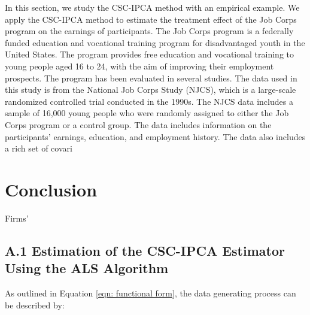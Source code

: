 \documentclass[12pt]{article}
\begin{document}
In this section, we study the CSC-IPCA method with an empirical example. We apply the CSC-IPCA method to estimate the treatment effect of the Job Corps program on the earnings of participants. The Job Corps program is a federally funded education and vocational training program for disadvantaged youth in the United States. The program provides free education and vocational training to young people aged 16 to 24, with the aim of improving their employment prospects. The program has been evaluated in several studies. The data used in this study is from the National Job Corps Study (NJCS), which is a large-scale randomized controlled trial conducted in the 1990s. The NJCS data includes a sample of 16,000 young people who were randomly assigned to either the Job Corps program or a control group. The data includes information on the participants' earnings, education, and employment history. The data also includes a rich set of covari
\section{Conclusion} 
\label{sec: conclusion}

Firms' 

\clearpage
\begingroup
{}


\endgroup

\clearpage
\setcounter{figure}{0}
\setcounter{table}{0}
\renewcommand\thetable{\Alph{section}.\arabic{table}}
\renewcommand\thefigure{\Alph{section}.\arabic{figure}}

\subsection*{A.1 Estimation of the CSC-IPCA Estimator Using the ALS Algorithm}

As outlined in Equation \ref{eqn: functional form}, the data generating process can be described by:
\end{document}
